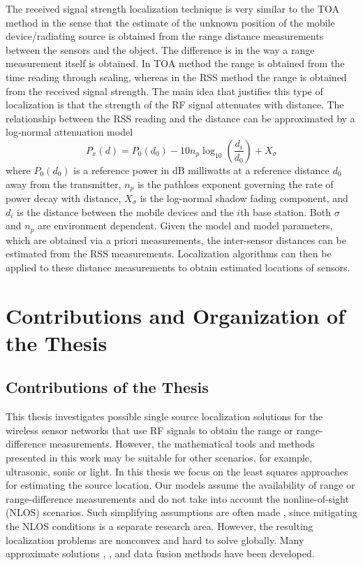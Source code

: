 The received signal strength localization technique is very similar to the TOA method in the sense that the estimate of the unknown position of the mobile device/radiating source is obtained from the range distance measurements between the sensors and the object.
The difference is in the way a range measurement itself is obtained. In TOA method the range is obtained from the time reading through scaling, whereas in the RSS method the range is obtained from the received signal strength. 
The main idea that justifies this type of localization is that the strength of the RF signal attenuates with distance. The relationship between the RSS reading and the distance can be approximated by a log-normal attenuation model \cite{LiuSurvey}
\begin{equation}
\nonumber
P_x(d) = P_0(d_0) - 10n_p\log_{10}\left(\frac{d_i}{d_0}\right) + X_{\sigma}
\end{equation}
where $P_0(d_0)$ is a reference power in dB milliwatts at a reference distance $d_0$ away from the transmitter, $n_p$ is the pathloss exponent governing the rate of power decay with distance, $X_{\sigma}$ is the log-normal shadow fading component, and $d_i$ is the distance between the mobile devices and the $i$th base station. Both $\sigma$ and $n_p$ are environment dependent. Given the model and model parameters, which are obtained via a priori measurements, the inter-sensor distances can be estimated from the RSS measurements. Localization algorithms can then be applied to these distance measurements to obtain estimated locations of sensors.

\section{Contributions and Organization of the Thesis}

\subsection{Contributions  of the Thesis} \label{contributions}


This thesis investigates possible single source  localization solutions for the wireless sensor networks that use RF  signals to obtain the range or range-difference measurements. However, the mathematical tools and methods presented in this work may be suitable for other scenarios, for example, ultrasonic, sonic or light. In this thesis we focus on the least squares approaches for estimating the source location. Our models assume the availability of range or range-difference measurements and do not take into account the nonline-of-sight (NLOS) scenarios. Such simplifying assumptions are often made \cite{Cheung}, \cite{classMDS} since mitigating the NLOS conditions is a separate research area. However, the resulting localization problems are nonconvex and hard to solve globally. Many approximate solutions \cite{SmithAbel}, \cite{LiHu}, \cite{Cheung} and data fusion methods \cite{Sayed} have been developed. 

